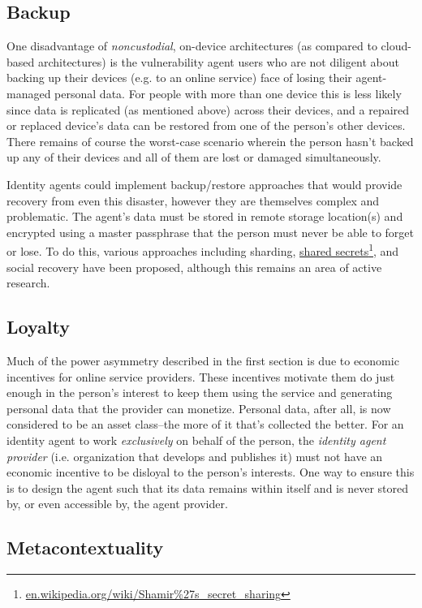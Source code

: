 \documentclass[11pt, oneside]{article}   	%
\newcommand{\hyperfootnote}[1][]{\def\ArgI{{#1}}\hyperfootnoteRelay}
\newcommand\hyperfootnoteRelay[2][]{\href{#1#2}{\ArgI}\footnote{\href{#1#2}{#2}}}
\begin{document}
\subsection{Backup} 

One disadvantage of \emph{noncustodial}, on-device architectures (as compared to cloud-based architectures) is the vulnerability agent users who are not diligent about backing up their devices (e.g. to an online service) face of losing their agent-managed personal data. For people with more than one device this is less likely since data is replicated (as mentioned above) across their devices, and a repaired or replaced device's data can be restored from one of the person's other devices. There remains of course the worst-case scenario wherein the person hasn't backed up any of their devices and all of them are lost or damaged simultaneously. 

Identity agents could implement backup/restore approaches that would provide recovery from even this disaster, however they are themselves complex and problematic. The agent's data must be stored in remote storage location(s) and encrypted using a master passphrase that the person must never be able to forget or lose. To do this, various approaches including sharding, \hyperfootnote[shared secrets][https://]{en.wikipedia.org/wiki/Shamir\%27s\_secret\_sharing}, and social recovery have been proposed, although this remains an area of active research. 

\subsection{Loyalty}

Much of the power asymmetry described in the first section is due to economic incentives for online service providers. These incentives motivate them do just enough in the person's interest to keep them using the service and generating personal data that the provider can monetize. Personal data, after all, is now considered to be an asset class--the more of it that's collected the better. For an identity agent to work \emph{exclusively} on behalf of the person, the \emph{identity agent provider} (i.e. organization that develops and publishes it) must not have an economic incentive to be disloyal to the person's interests. One way to ensure this is to design the agent such that its data remains within itself and is never stored by, or even accessible by, the agent provider.

\subsection{Metacontextuality}
\end{document}
